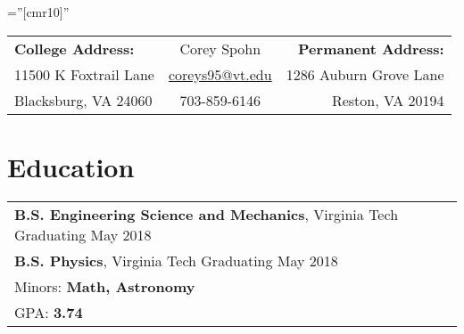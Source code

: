 \documentclass[a4paper]{article}
\begin{document}
\pagestyle{empty} %

\font\fb=''[cmr10]'' %


\begin{center}
\setlength{\tabcolsep}{15pt}
\begin{tabular}{l  c  r} 
\footnotesize{\textbf{College Address:}}& \Huge Corey Spohn & \footnotesize{\textbf{Permanent Address:}}\\[-0.5ex]
\footnotesize{11500 K Foxtrail Lane}&\href{mailto:coreys95@vt.edu}{coreys95@vt.edu}&\footnotesize{1286 Auburn Grove Lane}\\[-0.75ex]
\footnotesize{Blacksburg, VA 24060}&\footnotesize{703-859-6146}&\footnotesize{Reston, VA 20194}\\[-0.5ex]
\bottomrule[1mm]
\end{tabular}

\end{center}


\section{Education}

\begin{tabular}{p{15.5cm}}	
\textbf{B.S. Engineering Science and Mechanics}, Virginia Tech \hfill Graduating May 2018\\
\textbf{B.S. Physics}, Virginia Tech \hfill Graduating May 2018\\
Minors: \textbf{Math, Astronomy}\\
GPA: \bf{3.74}\\
\end{tabular}

\end{document}
